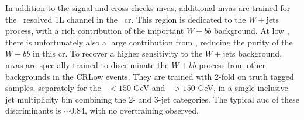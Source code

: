 In addition to the signal and cross-checks \glspl{mva}, additional \glspl{mva} are trained for the \vhb\ resolved 1L channel in the \lowdr\ \gls{cr}. This region is dedicated to the $W+$jets process, with a rich contribution of the important $W+bb$ background. At low \ptv, there is unfortunately also a large contribution from \ttb, reducing the purity of the $W+bb$ in this \gls{cr}. To recover a higher sensitivity to the $W+$jets background, \glspl{mva} are specially trained to discriminate the $W+bb$ process from other backgrounds in the CRLow events. They are trained with 2-fold on truth tagged samples, separately for the \ptv\ $< 150$ GeV and \ptv\ $> 150$ GeV, in a single inclusive jet multiplicity bin combining the 2- and 3-jet categories. The typical \gls{auc} of these discriminants is $\sim0.84$, with no overtraining observed.

